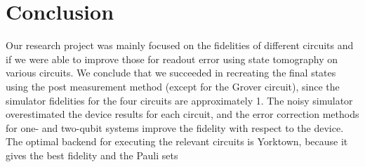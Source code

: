 \section{Conclusion}

Our research project was mainly focused on the fidelities of different circuits and if we were able to improve those for readout error using state tomography on various circuits. We conclude that we succeeded in recreating the final states using the post measurement method (except for the Grover circuit), since the simulator fidelities for the four circuits are approximately 1. The noisy simulator overestimated the device results for each circuit, and the error correction methods for one- and two-qubit systems improve the fidelity with respect to the device. The optimal backend for executing the relevant circuits is Yorktown, because it gives the best fidelity and the Pauli sets
